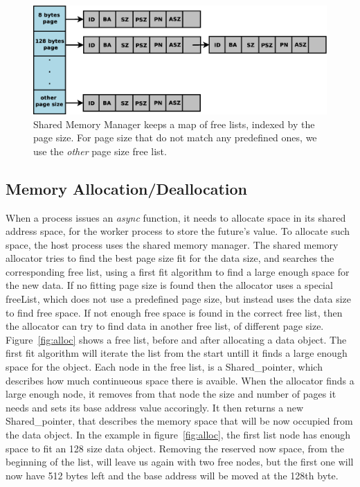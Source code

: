 \begin{figure}[here]
\includegraphics[width=\columnwidth]{figures/free_lists}
\caption{Shared Memory Manager keeps a map of free lists, indexed by the page size.  For page size that do
not match any predefined ones, we use the \emph{other} page size free list.}
\label{fig:freeLists}
\end{figure}

\subsection{Memory Allocation/Deallocation}
When a process issues an \emph{async} function, it needs to allocate space in its shared address space, for the worker process to store the future's value.  To allocate such space, the host process uses the shared memory manager. 
The shared memory allocator tries to find the best page size
fit for the data size, and searches the corresponding free list, using a first fit algorithm to find a large 
enough space for the new data. If no fitting page size is found then the allocator uses a special freeList, 
which does not use a predefined page size, but instead uses the data size to find free space.  If not enough free
space is found in the correct free list, then the allocator can try to find data in another free list, of different
page size.  Figure~\ref{fig:alloc} shows a free list, before and after allocating a data object.
The first fit algorithm
will iterate the list from the start untill it finds a large enough space for the object.  Each node in the free list,
is a Shared\_pointer, which describes how much continueous space there is avaible.  When the allocator finds a large
enough node, it removes from that node the size and number of pages it needs and sets its base address value 
accoringly.
It then returns a new Shared\_pointer, that describes the memory space that will be now occupied from the data object.
In the example in figure~\ref{fig:alloc}, the first list node has enough space to fit an 128 size data object.  
Removing the reserved now space, from the beginning of the list, will leave us again with two free nodes, but the
first one will now have 512 bytes left and the base address will be moved at the 128th byte.


